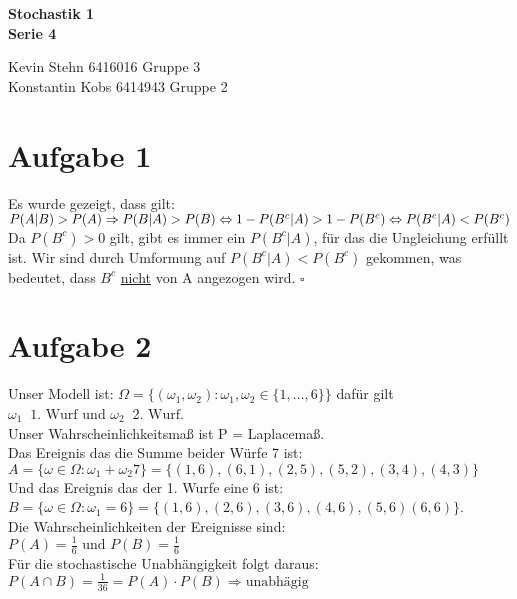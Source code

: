 \documentclass[10pt,a4paper]{article}
\newcommand{\ent}{\mathop{\widehat{=}}}
\newcommand{\w}{\omega}
\begin{document}
\begin{center}
\textbf{Stochastik 1 \\ Serie 4 \\}
\end{center}

\begin{flushright}
Kevin Stehn 6416016 Gruppe 3 \\
Konstantin Kobs 6414943 Gruppe 2
\end{flushright} 

\section*{Aufgabe 1}
Es wurde gezeigt, dass gilt:\\
$P(A|B) > P(A) \Rightarrow P(B|A) > P(B) \newline \Leftrightarrow 1 -P(B^c|A) > 1-P(B^c) \newline \Leftrightarrow P(B^c|A) < P(B^c)$\\
Da $P(B^c) > 0 $ gilt, gibt es immer ein $P(B^c|A)$, f\"ur das die Ungleichung erf\"ullt ist. Wir sind durch Umformung auf $P(B^c|A) < P(B^c)$ gekommen, was bedeutet, dass $B^c$ \underline{nicht} von A angezogen wird. $\square$

\section*{Aufgabe 2}
Unser Modell ist: $\Omega = \{(\w_1,\w_2) : \w_1,\w_2 \in \{1,...,6\} \}$ daf\"ur gilt\\
$\omega_1 \ent \text{1. Wurf}$ und $\w_2 \ent \text{2. Wurf}$.\\
Unser Wahrscheinlichkeitsmaß ist P = Laplacemaß.\\
Das Ereignis das die Summe beider W\"urfe 7 ist:\\
$A = \{\w \in \Omega : \w_1 + \w_2  7 \} = \{(1,6),(6,1),(2,5),(5,2),(3,4),(4,3) \}$\\
Und das Ereignis das der 1. Wurfe eine 6 ist:\\
$B = \{\w \in \Omega : \w_1 = 6\} = \{(1,6),(2,6),(3,6),(4,6),(5,6)(6,6)\}$.\\
Die Wahrscheinlichkeiten der Ereignisse sind:\\
$P(A) = \frac{1}{6} \text{ und } P(B) = \frac{1}{6}$ \\
F\"ur die stochastische Unabh\"angigkeit folgt daraus:\\
$P(A \cap B) = \frac{1}{36} = P(A) \cdot P(B) \Rightarrow \text{unabh\"agig}$
\end{document}

